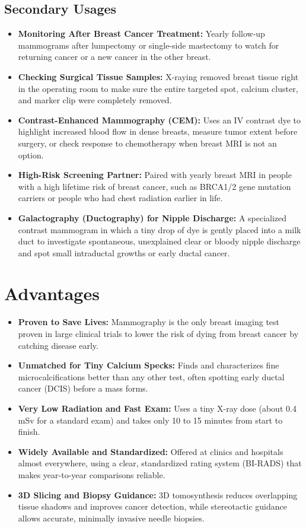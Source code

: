 \subsection{Secondary Usages}

\begin{itemize}
    \item \textbf{Monitoring After Breast Cancer Treatment:} Yearly follow-up mammograms after lumpectomy or single-side mastectomy to watch for returning cancer or a new cancer in the other breast.
    \item \textbf{Checking Surgical Tissue Samples:} X-raying removed breast tissue right in the operating room to make sure the entire targeted spot, calcium cluster, and marker clip were completely removed.
    \item \textbf{Contrast-Enhanced Mammography (CEM):} Uses an IV contrast dye to highlight increased blood flow in dense breasts, measure tumor extent before surgery, or check response to chemotherapy when breast MRI is not an option.
    \item \textbf{High-Risk Screening Partner:} Paired with yearly breast MRI in people with a high lifetime risk of breast cancer, such as BRCA1/2 gene mutation carriers or people who had chest radiation earlier in life.
    \item \textbf{Galactography (Ductography) for Nipple Discharge:} A specialized contrast mammogram in which a tiny drop of dye is gently placed into a milk duct to investigate spontaneous, unexplained clear or bloody nipple discharge and spot small intraductal growths or early ductal cancer.
\end{itemize}

\section{Advantages}

\begin{itemize}
    \item \textbf{Proven to Save Lives:} Mammography is the only breast imaging test proven in large clinical trials to lower the risk of dying from breast cancer by catching disease early.
    \item \textbf{Unmatched for Tiny Calcium Specks:} Finds and characterizes fine microcalcifications better than any other test, often spotting early ductal cancer (DCIS) before a mass forms.
    \item \textbf{Very Low Radiation and Fast Exam:} Uses a tiny X-ray dose (about 0.4 mSv for a standard exam) and takes only 10 to 15 minutes from start to finish.
    \item \textbf{Widely Available and Standardized:} Offered at clinics and hospitals almost everywhere, using a clear, standardized rating system (BI-RADS) that makes year-to-year comparisons reliable.
    \item \textbf{3D Slicing and Biopsy Guidance:} 3D tomosynthesis reduces overlapping tissue shadows and improves cancer detection, while stereotactic guidance allows accurate, minimally invasive needle biopsies.
\end{itemize}

